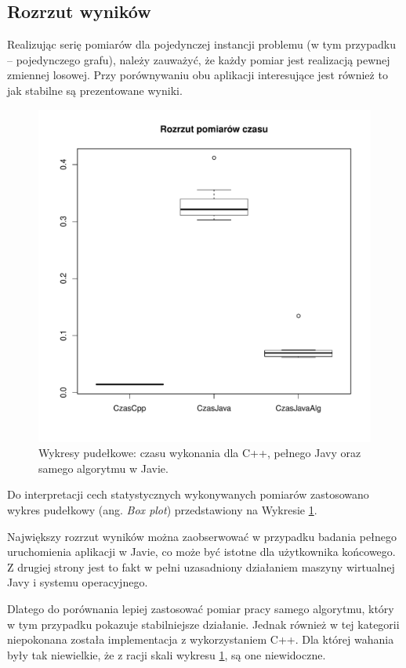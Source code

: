 \subsection{Rozrzut wyników}

Realizując serię pomiarów dla pojedynczej instancji problemu (w tym przypadku -- pojedynczego grafu), należy zauważyć, że każdy pomiar jest realizacją pewnej zmiennej losowej.
Przy porównywaniu obu aplikacji interesujące jest również to jak stabilne są prezentowane wyniki.

\begin{figure}
\centering
\includegraphics[scale=0.7]{plots/boxPlots.pdf}
\caption{Wykresy pudełkowe: czasu wykonania dla C++, pełnego Javy oraz samego algorytmu w Javie.}
\label{p:BoxPlot}
\end{figure}

Do interpretacji cech statystycznych wykonywanych pomiarów zastosowano wykres pudełkowy (ang. \textit{Box plot}) przedstawiony na Wykresie \ref{p:BoxPlot}.

Największy rozrzut wyników można zaobserwować w przypadku badania pełnego uruchomienia aplikacji w Javie, co może być istotne dla użytkownika końcowego.
Z drugiej strony jest to fakt w pełni uzasadniony działaniem maszyny wirtualnej Javy i systemu operacyjnego.

Dlatego do porównania lepiej zastosować pomiar pracy samego algorytmu, który w tym przypadku pokazuje stabilniejsze działanie. 
Jednak również w tej kategorii niepokonana została implementacja z wykorzystaniem C++. 
Dla której wahania były tak niewielkie, że z racji skali wykresu \ref{p:BoxPlot}, są one niewidoczne.


